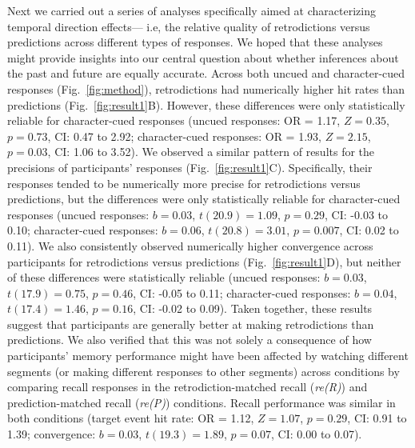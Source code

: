 \documentclass[10pt]{article}
\begin{document}
Next we carried out a series of analyses specifically aimed at characterizing temporal direction effects--- i.e, the relative quality of retrodictions versus predictions across different types of responses.  We hoped that these analyses might provide insights into our central question about whether inferences about the past and future are equally accurate.  Across both uncued and character-cued responses (Fig.~\ref{fig:method}), retrodictions had numerically higher hit rates than predictions (Fig.~\ref{fig:result1}B).  However, these differences were only statistically reliable for character-cued responses (uncued responses: OR = 1.17, $Z = 0.35$, $p = 0.73$, CI: 0.47 to 2.92; character-cued responses: OR = 1.93, $Z = 2.15$, $p = 0.03$, CI: 1.06 to 3.52).  We observed a similar pattern of results for the precisions of participants' responses (Fig.~\ref{fig:result1}C).  Specifically, their responses tended to be numerically more precise for retrodictions versus predictions, but the differences were only statistically reliable for character-cued responses (uncued responses: $b = 0.03$, $t(20.9) = 1.09$, $p = 0.29$, CI: -0.03 to 0.10; character-cued responses: $b = 0.06$, $t(20.8) = 3.01$, $p = 0.007$, CI: 0.02 to 0.11).  We also consistently observed numerically higher convergence across participants for retrodictions versus predictions (Fig.~\ref{fig:result1}D), but neither of these differences were statistically reliable (uncued responses: $b = 0.03$, $t(17.9) = 0.75$, $p = 0.46$, CI: -0.05 to 0.11; character-cued responses: $b = 0.04$, $t(17.4) = 1.46$, $p = 0.16$, CI: -0.02 to 0.09).  Taken together, these results suggest that participants are generally better at making retrodictions than predictions.  We also verified that this was not solely a consequence of how participants' memory performance might have been affected by watching different segments (or making different responses to other segments) across conditions by comparing recall responses in the retrodiction-matched recall (\textit{re(R)}) and prediction-matched recall (\textit{re(P)}) conditions.  Recall performance was similar in both conditions (target event hit rate: OR = 1.12, $Z = 1.07$, $p = 0.29$, CI: 0.91 to 1.39; convergence: $b = 0.03$, $t(19.3) = 1.89$, $p = 0.07$, CI: 0.00 to 0.07).
\end{document}
